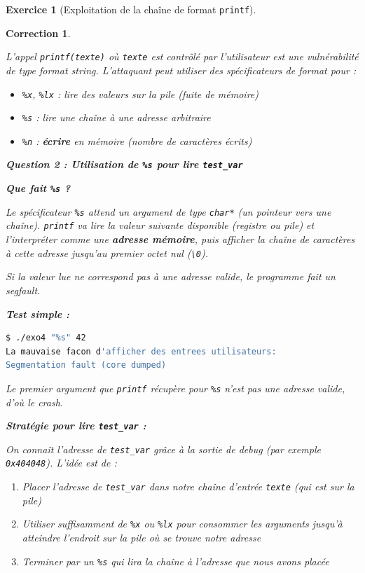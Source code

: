 \documentclass[a4paper,11pt]{article}
\theoremstyle{plain}
\newtheorem{correction}{Correction}
\theoremstyle{definition}
\newtheorem{exercice}{Exercice}
\begin{document}
\begin{exercice}[Exploitation de la chaîne de format \texttt{printf}]
\begin{correction}
\begin{pointcle}
L'appel \texttt{printf(texte)} où \texttt{texte} est contrôlé par l'utilisateur est une vulnérabilité de type \textit{format string}. L'attaquant peut utiliser des spécificateurs de format pour :
\begin{itemize}
    \item \texttt{\%x}, \texttt{\%lx} : lire des valeurs sur la pile (fuite de mémoire)
    \item \texttt{\%s} : lire une chaîne à une adresse arbitraire
    \item \texttt{\%n} : \textbf{écrire} en mémoire (nombre de caractères écrits)
\end{itemize}
\end{pointcle}

\bigskip

\textbf{Question 2 : Utilisation de \texttt{\%s} pour lire \texttt{test\_var}}

\medskip

\textbf{Que fait \texttt{\%s} ?}

Le spécificateur \texttt{\%s} attend un argument de type \texttt{char*} (un pointeur vers une chaîne). \texttt{printf} va lire la valeur suivante disponible (registre ou pile) et l'interpréter comme une \textbf{adresse mémoire}, puis afficher la chaîne de caractères à cette adresse jusqu'au premier octet nul (\texttt{\textbackslash 0}).

Si la valeur lue ne correspond pas à une adresse valide, le programme fait un \textit{segfault}.

\textbf{Test simple :}
\begin{lstlisting}[language=bash,numbers=none]
$ ./exo4 "%s" 42
La mauvaise facon d'afficher des entrees utilisateurs:
Segmentation fault (core dumped)
\end{lstlisting}

Le premier \og{}argument\fg{} que \texttt{printf} récupère pour \texttt{\%s} n'est pas une adresse valide, d'où le crash.

\textbf{Stratégie pour lire \texttt{test\_var} :}

On connaît l'adresse de \texttt{test\_var} grâce à la sortie de debug (par exemple \texttt{0x404048}). L'idée est de :
\begin{enumerate}
    \item Placer l'adresse de \texttt{test\_var} dans notre chaîne d'entrée \texttt{texte} (qui est sur la pile)
    \item Utiliser suffisamment de \texttt{\%x} ou \texttt{\%lx} pour \og{}consommer\fg{} les arguments jusqu'à atteindre l'endroit sur la pile où se trouve notre adresse
    \item Terminer par un \texttt{\%s} qui lira la chaîne à l'adresse que nous avons placée
\end{enumerate}


\end{correction}
\end{exercice}
\end{document}
